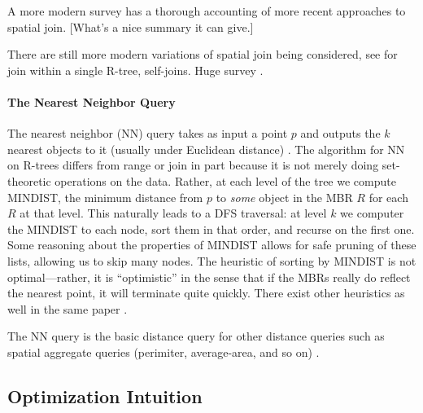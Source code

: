 A more modern survey \cite{jacoxsamet07} has a thorough accounting of more recent approaches to spatial join.
[What's a nice summary it can give.]

There are still more modern variations of spatial join being considered, see \cite{vassilakopouloscorralkaranikolas11} for join within a single R-tree, self-joins.
Huge survey \cite{jacoxsamet07}.

\paragraph{The Nearest Neighbor Query}
The nearest neighbor (NN) query takes as input a point $p$ and outputs the $k$ nearest objects to it (usually under Euclidean distance) \cite{roussopouloskelleyvincent95}.
The algorithm for NN on R-trees differs from range or join in part because it is not merely doing set-theoretic operations on the data. 
Rather, at each level of the tree we compute MINDIST, the minimum distance from $p$ to \emph{some} object in the MBR $R$ for each $R$ at that level.
This naturally leads to a DFS traversal: at level $k$ we computer the MINDIST to each node, sort them in that order, and recurse on the first one.
Some reasoning about the properties of MINDIST allows for safe pruning of these lists, allowing us to skip many nodes.
The heuristic of sorting by MINDIST is not optimal---rather, it is ``optimistic'' in the sense that if the MBRs really do reflect the nearest point, it will terminate quite quickly.
There exist other heuristics as well in the same paper \cite{roussopouloskelleyvincent95}.

The NN query is the basic distance query for other distance queries such as spatial aggregate queries (perimiter, average-area, and so on) \cite{corralalmendros-jimenez07}.


\subsection{Optimization Intuition}

